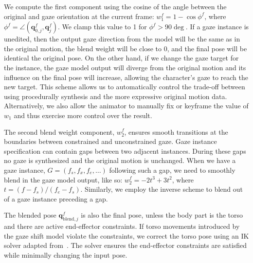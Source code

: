 We compute the first component using the cosine of the angle between the original and gaze orientation at the current frame: $w_1^f = 1 - \cos \phi^f$, where $\phi^f = \angle(\mathbf{q}_{0,j}^f, \mathbf{q}_j^f)$. We clamp this value to 1 for $\phi^f > 90 \deg$. If a gaze instance is unedited, then the output gaze direction from the model will be the same as in the original motion, the blend weight will be close to 0, and the final pose will be identical the original pose. On the other hand, if we change the gaze target for the instance, the gaze model output will diverge from the original motion and its influence on the final pose will increase, allowing the character's gaze to reach the new target. This scheme allows us to automatically control the trade-off between using procedurally synthesis and the more expressive original motion data. Alternatively, we also allow the animator to manually fix or keyframe the value of $w_1$ and thus exercise more control over the result.

The second blend weight component, $w_2^f$, ensures smooth transitions at the boundaries between constrained and unconstrained gaze. Gaze instance specification can contain gaps between two adjacent instances. During these gaps no gaze is synthesized and the original motion is unchanged. When we have a gaze instance, $G = (f_s, f_x, f_e, \ldots)$ following such a gap, we need to smoothly blend in the gaze model output, like so: $w_2^f = -2 t^3 + 3 t^2$, where $t = (f - f_s)/(f_e - f_s)$. Similarly, we employ the inverse scheme to blend out of a gaze instance preceding a gap.

The blended pose $\mathbf{q}_{\mathrm{blend},j}^f$ is also the final pose, unless the body part is the torso and there are active end-effector constraints. If torso movements introduced by the gaze shift model violate the constraints, we correct the torso pose using an IK solver adapted from~\citep{shin2001puppetry}. The solver ensures the end-effector constraints are satisfied while minimally changing the input pose. 